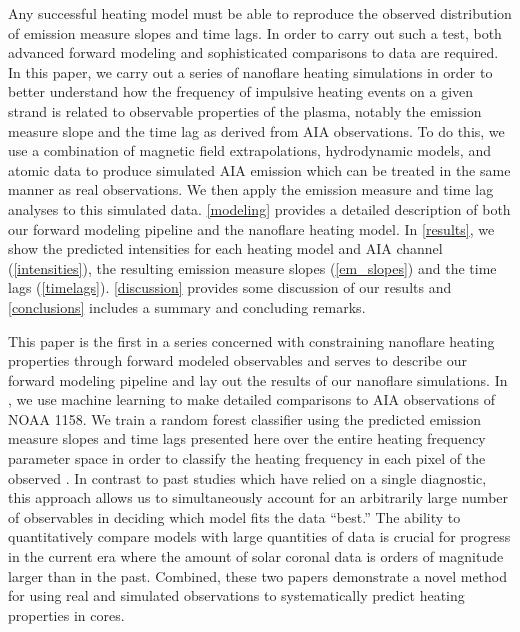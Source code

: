 Any successful heating model must be able to reproduce the observed distribution of emission measure slopes and time lags. In order to carry out such a test, both advanced forward modeling and sophisticated comparisons to data are required. In this paper, we carry out a series of nanoflare heating simulations in order to better understand how the frequency of impulsive heating events on a given strand is related to observable properties of the plasma, notably the emission measure slope and the time lag as derived from AIA observations. To do this, we use a combination of magnetic field extrapolations, hydrodynamic models, and atomic data to produce simulated AIA emission which can be treated in the same manner as real observations. We then apply the emission measure and time lag analyses to this simulated data. \autoref{modeling} provides a detailed description of both our forward modeling pipeline and the nanoflare heating model. In \autoref{results}, we show the predicted intensities for each heating model and AIA channel (\autoref{intensities}), the resulting emission measure slopes (\autoref{em_slopes}) and the time lags (\autoref{timelags}). \autoref{discussion} provides some discussion of our results and \autoref{conclusions} includes a summary and concluding remarks.

This paper is the first in a series concerned with constraining nanoflare heating properties through forward modeled observables and serves to describe our forward modeling pipeline and lay out the results of our nanoflare simulations. In \citet[ hereafter]{barnes_understanding_2019-1}, we use machine learning to make detailed comparisons to AIA observations of \AR{} NOAA 1158. We train a random forest classifier using the predicted emission measure slopes and time lags presented here over the entire heating frequency parameter space in order to classify the heating frequency in each pixel of the observed \AR{}. In contrast to past studies which have relied on a single diagnostic, this approach allows us to simultaneously account for an arbitrarily large number of observables in deciding which model fits the data ``best.'' The ability to quantitatively compare models with large quantities of data is crucial for progress in the current era where the amount of solar coronal data is orders of magnitude larger than in the past.  Combined, these two papers demonstrate a novel method for using real and simulated observations to systematically predict heating properties in \AR{} cores.
